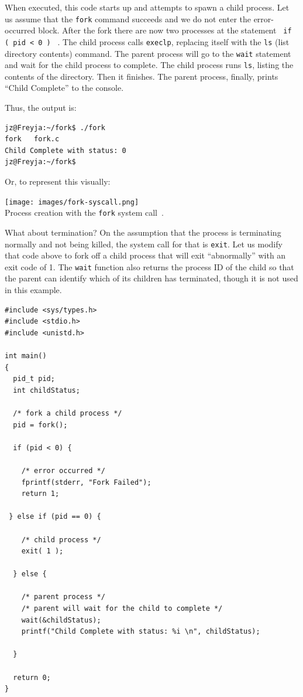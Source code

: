 When executed, this code starts up and attempts to spawn a child process. Let us assume that the \texttt{fork} command succeeds and we do not enter the error-occurred block.  After the fork there are now two processes at the statement \texttt{ if ( pid < 0 ) } . The child process calls \texttt{execlp}, replacing itself with the \texttt{ls} (list directory contents) command. The parent process will go to the \texttt{wait} statement and wait for the child process to complete. The child process runs \texttt{ls}, listing the contents of the directory. Then it finishes. The parent process, finally, prints ``Child Complete'' to the console.

Thus, the output is:
\begin{verbatim}
jz@Freyja:~/fork$ ./fork 
fork   fork.c
Child Complete with status: 0
jz@Freyja:~/fork$ 
\end{verbatim}

Or, to represent this visually:

\begin{center}
\texttt{[image: images/fork-syscall.png]}\\
Process creation with the \texttt{fork} system call~\cite{osc}.
\end{center}

What about termination? On the assumption that the process is terminating normally and not being killed, the system call for that is \texttt{exit}. Let us modify that code above to fork off a child process that will exit ``abnormally'' with an exit code of 1. The \texttt{wait} function also returns the process ID of the child so that the parent can identify which of its children has terminated, though it is not used in this example.


\begin{verbatim}
#include <sys/types.h>
#include <stdio.h> 
#include <unistd.h>

int main()
{
  pid_t pid;
  int childStatus;

  /* fork a child process */
  pid = fork();
  
  if (pid < 0) { 
  
    /* error occurred */ 
    fprintf(stderr, "Fork Failed"); 
    return 1;
    
 } else if (pid == 0) { 
    
    /* child process */
    exit( 1 );
    
  } else { 
    
    /* parent process */
    /* parent will wait for the child to complete */
    wait(&childStatus);
    printf("Child Complete with status: %i \n", childStatus);
    
  }
    
  return 0;
}
\end{verbatim}

